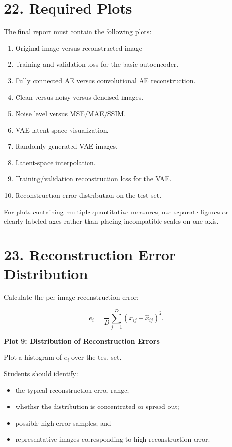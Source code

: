 \documentclass[10pt]{article}
\begin{document}
\section*{22. Required Plots}

The final report must contain the following plots:

\begin{enumerate}
\item Original image versus reconstructed image.
\item Training and validation loss for the basic autoencoder.
\item Fully connected AE versus convolutional AE reconstruction.
\item Clean versus noisy versus denoised images.
\item Noise level versus MSE/MAE/SSIM.
\item VAE latent-space visualization.
\item Randomly generated VAE images.
\item Latent-space interpolation.
\item Training/validation reconstruction loss for the VAE.
\item Reconstruction-error distribution on the test set.
\end{enumerate}

For plots containing multiple quantitative measures, use separate figures or
clearly labeled axes rather than placing incompatible scales on one axis.

\section*{23. Reconstruction Error Distribution}

Calculate the per-image reconstruction error:

\[
e_i=
\frac{1}{D}
\sum_{j=1}^{D}
(x_{ij}-\hat{x}_{ij})^2.
\]

\textbf{Plot 9: Distribution of Reconstruction Errors}

Plot a histogram of $e_i$ over the test set.

Students should identify:

\begin{itemize}
\item the typical reconstruction-error range;
\item whether the distribution is concentrated or spread out;
\item possible high-error samples; and
\item representative images corresponding to high reconstruction error.
\end{itemize}
\end{document}
